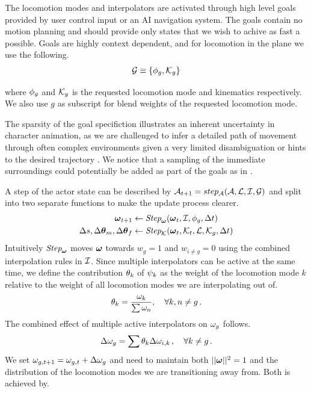 The locomotion modes and interpolators are activated through high level goals provided by user control input or an AI navigation system. The goals contain no motion planning and should provide only states that we wish to achive as fast a possible. Goals are highly context dependent, and for locomotion in the plane we use the following.
\begin{subequations}
\begin{align}
     \mathcal{G} &\equiv \left\{ \phi_g, \mathcal{K}_g \right\} \label{eq:goals:def} \\
\end{align}
\end{subequations}

where $\phi_g$ and $\mathcal{K}_g$ is the requested locomotion mode and kinematics respectively. We also use $g$ as subscript for blend weights of the requested locomotion mode.

The sparsity of the goal specifiction illustrates an inherent uncertainty in character animation, as we are challenged to infer a detailed path of movement through often complex environments given a very limited disambiguation or hints to the desired trajectory \cite{holden.ea16}. We notice that a sampling of the immediate surroundings could potentially be added as part of the goals as in \cite{holden.ea17}. 

A step of the actor state can be described by $\mathcal{A}_{t+1} = step_{\mathcal{A}}(\mathcal{A}, \mathcal{L}, \mathcal{I}, \mathcal{G})$ and split into two separate functions to make the update process clearer.
\begin{subequations}
\begin{align}
    \boldsymbol{\omega }_{t+1} &\leftarrow \textit{Step}_{\boldsymbol{\omega }}( \boldsymbol{\omega }_{t}, \mathcal{I}, \phi_g, \Delta{t}) \label{eq:step:interpolators}\\
    \Delta{s}, {\Delta{ \boldsymbol{\theta } }_m}, {\Delta{ \boldsymbol{\theta } }_f} &\leftarrow  \textit{Step}_{\mathcal{K}}(\boldsymbol{\omega }_t, \mathcal{K}_{t},  \mathcal{L}, \mathcal{K}_{g}, \Delta{t} )\label{eq:step:modes}
\end{align}
\end{subequations}
Intuitively $\textit{Step}_{\boldsymbol{\omega }}$ moves $\boldsymbol{\omega }$ towards $w_g=1$ and $w_{i\neq{g}}=0$ using the combined interpolation rules in $\mathcal{I}$. Since multiple interpolators can be active at the same time, we define the contribution $\theta_k$ of $\psi_k$ as the weight of the locomotion mode $k$ relative to the weight of all locomotion modes we are interpolating out of. 
\begin{equation}
\theta_{k}=\dfrac{\omega_k}{\sum{ \omega _n}},
\quad \forall k, n \neq g \,.
\end{equation}
The combined effect of multiple active interpolators on $\omega_g$ follows.
\begin{equation}
\Delta{ \omega }_g = \sum \theta_k \Delta{ \omega }_{i,k} \,,
\quad \forall k \neq g \,.
\end{equation}
We set $\omega_{g,t+1}=\omega_{g,t}+\Delta{ \omega }_g$ and need to maintain both $||\boldsymbol{\omega }||^2=1$ and the distribution of the locomotion modes we are transitioning away from. Both is achieved by.


